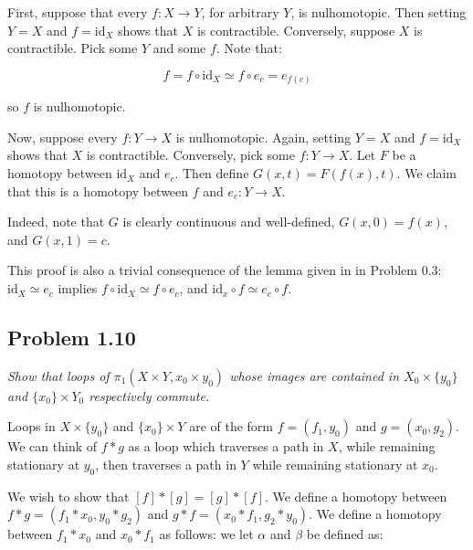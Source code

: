 \documentclass[10pt, oneside]{amsart}
\begin{document}
    First, suppose that every $f : X \rightarrow Y$, for arbitrary $Y$, is nulhomotopic. Then setting $Y = X$ and $f = \text{id}_{X}$ shows that $X$ is contractible. Conversely,
    suppose $X$ is contractible. Pick some $Y$ and some $f$. Note that:

    $$f = f \circ \text{id}_{X} \simeq f \circ e_{c} = e_{f(c)}$$

    so $f$ is nulhomotopic.
    \newline

    Now, suppose every $f : Y \rightarrow X$ is nulhomotopic. Again, setting $Y = X$ and $f = \text{id}_{X}$ shows that $X$ is contractible. Conversely, pick some $f : Y \rightarrow X$.
    Let $F$ be a homotopy between $\text{id}_{X}$ and $e_c$. Then define $G(x, t) = F(f(x), t)$. We claim that this is a homotopy between $f$ and $e_c : Y \rightarrow X$.
    \newline

    Indeed, note that $G$ is clearly continuous and well-defined, $G(x, 0) = f(x)$, and $G(x, 1) = c$.
    \newline

    This proof is also a trivial consequence of the lemma given in in Problem 0.3: $\text{id}_{X} \simeq e_c$ implies $f \circ \text{id}_{X} \simeq f \circ e_c$, and $\text{id}_{x} \circ f \simeq e_c \circ f$.

    \hrulefill

    \subsection{Problem 1.10}

    \textit{Show that loops of $\pi_1(X \times Y, x_0 \times y_0)$ whose images are contained in $X_0 \times \{y_0\}$ and $\{x_0\} \times Y_0$ respectively commute.}
    \newline

    Loops in $X \times \{y_0\}$ and $\{x_0\} \times Y$ are of the form $f = (f_1, y_0)$ and $g = (x_0, g_2)$. We can think of $f * g$ as a loop which traverses a path in $X$, while remaining stationary at
    $y_0$, then traverses a path in $Y$ while remaining stationary at $x_0$.
    \newline

    We wish to show that $[f] * [g] = [g] * [f]$. We define a homotopy between $f * g = (f_1 * x_0, y_0 * g_2)$ and $g * f = (x_0 * f_1, g_2 * y_0)$. We define a homotopy between $f_1 * x_0$ and
    $x_0 * f_1$ as follows: we let $\alpha$ and $\beta$ be defined as:
\end{document}
